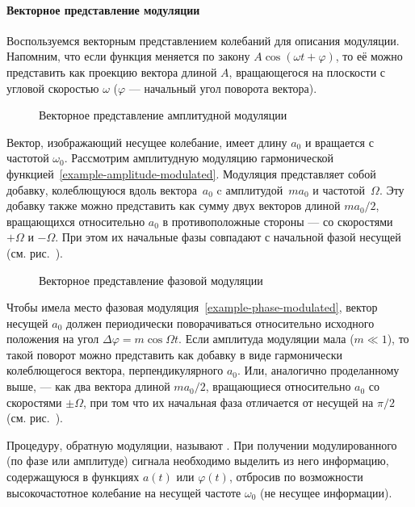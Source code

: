 \paragraph{Векторное представление модуляции}
Воспользуемся векторным представлением колебаний для описания модуляции.
Напомним, что если функция меняется по закону $A\cos (\omega t + \varphi)$,
то её можно представить как проекцию вектора
длиной $A$, вращающегося на плоскости с угловой скоростью $\omega$
($\varphi$ --- начальный угол поворота вектора).

\begin{figure}[h!]
    \centering
    \caption{Векторное представление амплитудной модуляции}
\end{figure}
Вектор, изображающий несущее колебание, имеет длину $a_0$
и вращается с частотой $\omega_0$.
Рассмотрим амплитудную модуляцию гармонической 
функцией~\eqref{example-amplitude-modulated}.
Модуляция представляет собой добавку, колеблющуюся вдоль 
вектора~$a_0$ c амплитудой~$ma_0$ и частотой~$\Omega$.
Эту добавку также можно представить как сумму двух векторов длиной
$ma_0/2$, вращающихся относительно $a_0$ в противоположные стороны ---
со скоростями $+\Omega$ и $-\Omega$. При этом их начальные фазы совпадают
с начальной фазой несущей (см. рис.~).

\begin{figure}[h!]
    \centering
    \caption{Векторное представление фазовой модуляции}
\end{figure}

Чтобы имела место фазовая модуляция~\eqref{example-phase-modulated},
вектор несущей $a_0$ должен периодически поворачиваться относительно 
исходного положения на угол $\Delta \varphi = m\cos \Omega t$. 
Если амплитуда модуляции мала ($m\ll 1$), то такой поворот можно представить 
как добавку в виде гармонически колеблющегося вектора, перпендикулярного
$a_0$. Или, аналогично проделанному выше, --- как 
два вектора длиной $ma_0/2$, вращающиеся относительно $a_0$ 
со скоростями $\pm\Omega$, при том что их начальная фаза отличается от несущей
на $\pi/2$ (см. рис.~).


Процедуру, обратную модуляции, называют .
При получении модулированного (по фазе или амплитуде) сигнала необходимо
выделить из него информацию, содержащуюся в функциях $a(t)$ или
$\varphi(t)$, отбросив по возможности высокочастотное колебание
на несущей частоте $\omega_0$ (не несущее информации).

